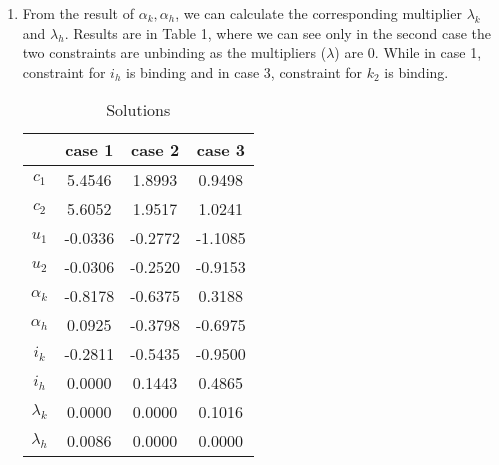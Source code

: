 \begin{enumerate}
\item
From the result of $\alpha_k,\alpha_h$, we can calculate the corresponding multiplier $\lambda_{k}$ and $\lambda_{h}$. Results are in Table 1, where we can see only in the second case the two constraints are unbinding as the multipliers ($\lambda$) are 0. While in case 1, constraint for $i_{h}$ is binding and in case 3, constraint for $k_{2}$ is binding.
\begin{table}
\centering
\begin{tabular}{cccc}
\hline\hline
	 & 	case 1 & 	case 2 & 	case 3\\
\hline
 	
	$c_{1}$ & 	5.4546 & 	1.8993 & 	0.9498\\
	$c_{2}$ & 	5.6052 & 	1.9517 & 	1.0241\\
	$u_{1}$  & 	-0.0336 & 	-0.2772 & 	-1.1085\\
	$u_{2}$  & 	-0.0306 & 	-0.2520 & 	-0.9153\\
	$\alpha_{k}$ & 	-0.8178 & 	-0.6375 & 	0.3188\\
	$\alpha_{h}$ & 	0.0925 & 	-0.3798 & 	-0.6975\\
	$i_{k}$ & 	-0.2811 & 	-0.5435 & 	-0.9500\\
	$i_{h}$ & 	0.0000 & 	0.1443 & 	0.4865\\
	$\lambda_{k}$ & 	0.0000 & 	0.0000 & 	0.1016\\
	$\lambda_{h}$ & 	0.0086 & 	0.0000 & 	0.0000\\
	
\hline\hline
\end{tabular}
\caption{Solutions}
\end{table}
 

\end{enumerate}

